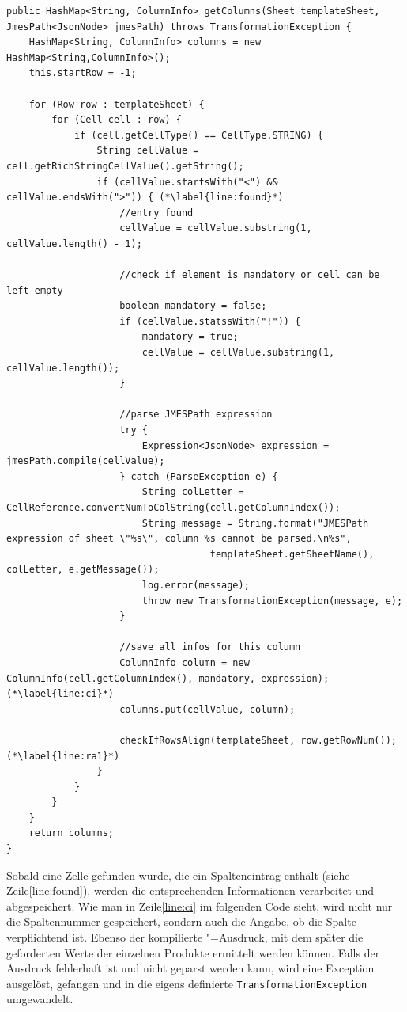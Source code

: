 \begin{lstlisting}[emph={columns, templateSheet, jmesPath, startRow, mandatory, row, cell, cellValue, message, e, column, colLetter, rowNumber, expression, log},
caption=Einlesen der Spalteninformationen in \texttt{TemplateReader}, label=code:col]
public HashMap<String, ColumnInfo> getColumns(Sheet templateSheet, JmesPath<JsonNode> jmesPath) throws TransformationException {
	HashMap<String, ColumnInfo> columns = new HashMap<String,ColumnInfo>();
	this.startRow = -1;

	for (Row row : templateSheet) {
		for (Cell cell : row) {
			if (cell.getCellType() == CellType.STRING) {
				String cellValue = cell.getRichStringCellValue().getString();
				if (cellValue.startsWith("<") && cellValue.endsWith(">")) { (*\label{line:found}*)
					//entry found
					cellValue = cellValue.substring(1, cellValue.length() - 1);
					
					//check if element is mandatory or cell can be left empty
					boolean mandatory = false;
					if (cellValue.statssWith("!")) {
						mandatory = true;
						cellValue = cellValue.substring(1, cellValue.length());
					}
					
					//parse JMESPath expression
					try {
						Expression<JsonNode> expression = jmesPath.compile(cellValue);
					} catch (ParseException e) {
						String colLetter = CellReference.convertNumToColString(cell.getColumnIndex());
						String message = String.format("JMESPath expression of sheet \"%s\", column %s cannot be parsed.\n%s",
									templateSheet.getSheetName(), colLetter, e.getMessage());
						log.error(message);
						throw new TransformationException(message, e);
					}

					//save all infos for this column
					ColumnInfo column = new ColumnInfo(cell.getColumnIndex(), mandatory, expression); (*\label{line:ci}*)
					columns.put(cellValue, column);

					checkIfRowsAlign(templateSheet, row.getRowNum());  (*\label{line:ra1}*)
				}
			}
		}
	}
	return columns;
}
\end{lstlisting}
Sobald eine Zelle gefunden wurde, die ein Spalteneintrag enthält (siehe Zeile\nbs\ref{line:found}), werden die entsprechenden Informationen verarbeitet und abgespeichert.
Wie man in Zeile\nbs\ref{line:ci} im folgenden Code sieht, wird nicht nur die Spaltennummer gespeichert, sondern auch die Angabe, ob die Spalte verpflichtend ist. Ebenso der kompilierte "=Ausdruck, mit dem später die geforderten Werte der einzelnen Produkte ermittelt werden können. Falls der Ausdruck fehlerhaft ist und nicht geparst werden kann, wird eine Exception ausgelöst, gefangen und in die eigens definierte \texttt{TransformationException} umgewandelt.\\
